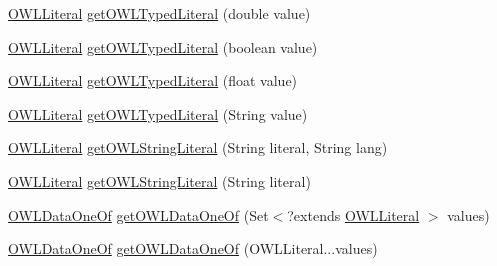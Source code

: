 \begin{DoxyCompactItemize}
\item 
\hyperlink{interfaceorg_1_1semanticweb_1_1owlapi_1_1model_1_1_o_w_l_literal}{O\-W\-L\-Literal} \hyperlink{interfaceorg_1_1semanticweb_1_1owlapi_1_1model_1_1_o_w_l_data_factory_a76989cb1bb3ddd70b180935bd184b53a}{get\-O\-W\-L\-Typed\-Literal} (double value)
\item 
\hyperlink{interfaceorg_1_1semanticweb_1_1owlapi_1_1model_1_1_o_w_l_literal}{O\-W\-L\-Literal} \hyperlink{interfaceorg_1_1semanticweb_1_1owlapi_1_1model_1_1_o_w_l_data_factory_a1ea74721fc57a811106a9ed9db4d8e39}{get\-O\-W\-L\-Typed\-Literal} (boolean value)
\item 
\hyperlink{interfaceorg_1_1semanticweb_1_1owlapi_1_1model_1_1_o_w_l_literal}{O\-W\-L\-Literal} \hyperlink{interfaceorg_1_1semanticweb_1_1owlapi_1_1model_1_1_o_w_l_data_factory_a47caa4baefc31d1fbeb9b64fc9d7c6bd}{get\-O\-W\-L\-Typed\-Literal} (float value)
\item 
\hyperlink{interfaceorg_1_1semanticweb_1_1owlapi_1_1model_1_1_o_w_l_literal}{O\-W\-L\-Literal} \hyperlink{interfaceorg_1_1semanticweb_1_1owlapi_1_1model_1_1_o_w_l_data_factory_a6b9d863c0f429efb03cc40d24cd954e0}{get\-O\-W\-L\-Typed\-Literal} (String value)
\item 
\hyperlink{interfaceorg_1_1semanticweb_1_1owlapi_1_1model_1_1_o_w_l_literal}{O\-W\-L\-Literal} \hyperlink{interfaceorg_1_1semanticweb_1_1owlapi_1_1model_1_1_o_w_l_data_factory_a198df35831b94d7b6cd3d2f78c0ddd96}{get\-O\-W\-L\-String\-Literal} (String literal, String lang)
\item 
\hyperlink{interfaceorg_1_1semanticweb_1_1owlapi_1_1model_1_1_o_w_l_literal}{O\-W\-L\-Literal} \hyperlink{interfaceorg_1_1semanticweb_1_1owlapi_1_1model_1_1_o_w_l_data_factory_ab4013507f93c4919875c37108a60008c}{get\-O\-W\-L\-String\-Literal} (String literal)
\item 
\hyperlink{interfaceorg_1_1semanticweb_1_1owlapi_1_1model_1_1_o_w_l_data_one_of}{O\-W\-L\-Data\-One\-Of} \hyperlink{interfaceorg_1_1semanticweb_1_1owlapi_1_1model_1_1_o_w_l_data_factory_a954642dc1970a16e4d1fd195d7a6933b}{get\-O\-W\-L\-Data\-One\-Of} (Set$<$?extends \hyperlink{interfaceorg_1_1semanticweb_1_1owlapi_1_1model_1_1_o_w_l_literal}{O\-W\-L\-Literal} $>$ values)
\item 
\hyperlink{interfaceorg_1_1semanticweb_1_1owlapi_1_1model_1_1_o_w_l_data_one_of}{O\-W\-L\-Data\-One\-Of} \hyperlink{interfaceorg_1_1semanticweb_1_1owlapi_1_1model_1_1_o_w_l_data_factory_a24cebdccc3bef30d242bcb161625b8bf}{get\-O\-W\-L\-Data\-One\-Of} (O\-W\-L\-Literal...\-values)
\item 

\end{DoxyCompactItemize}
